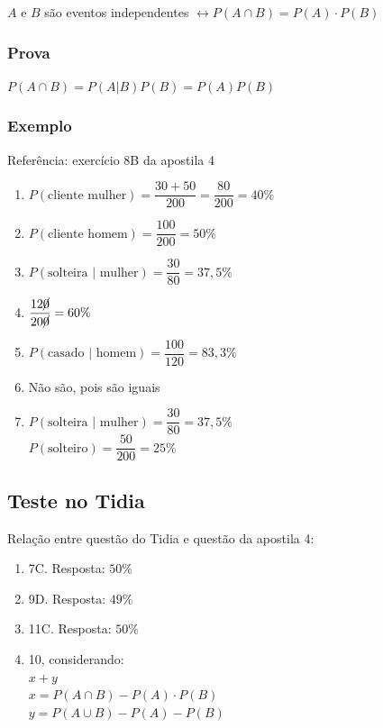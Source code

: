 \documentclass[a4paper]{article}
\begin{document}
	$A$ e $B$ são eventos independentes \hspace{5mm} $\leftrightarrow P(A \cap B) = P(A) \cdot P(B)$
	
	\subsubsection{Prova}
	
	$P(A \cap B) = P(A|B)P(B) = P(A)P(B)$
	
	\subsubsection{Exemplo}
	
	Referência: exercício 8B da apostila 4
	
	\begin{enumerate}[label=\alph*.]
		\item $P(\text{cliente mulher}) = \dfrac{30 + 50}{200} = \dfrac{80}{200} = 40\%$
		\item $P(\text{cliente homem}) = \dfrac{100}{200} = 50\%$
		\item $P(\text{solteira }|\text{ mulher}) = \dfrac{30}{80} = 37,5\%$
		\item $\dfrac{12\cancel{0}}{20\cancel{0}} = 60\%$
		\item $P(\text{casado }|\text{ homem}) = \dfrac{100}{120} = 83,3\%$
		\item Não são, pois são iguais
		\item $P(\text{solteira }|\text{ mulher}) = \dfrac{30}{80} = 37,5\%$ \\
			$P(\text{solteiro}) = \dfrac{50}{200} = 25\%$\\
	\end{enumerate}

	\subsection{Teste no Tidia}
	
	Relação entre questão do Tidia e questão da apostila 4:
	
	\begin{enumerate}
		\item 7C. Resposta: $50\%$
		\item 9D. Resposta: $49\%$
		\item 11C. Resposta: $50\%$
		\item 10, considerando: \\
			$x+y$ \\
			$x = P(A \cap B) - P(A) \cdot P(B)$ \\
			$y = P(A \cup B) - P(A) - P(B)$
	\end{enumerate}
	
\end{document}
